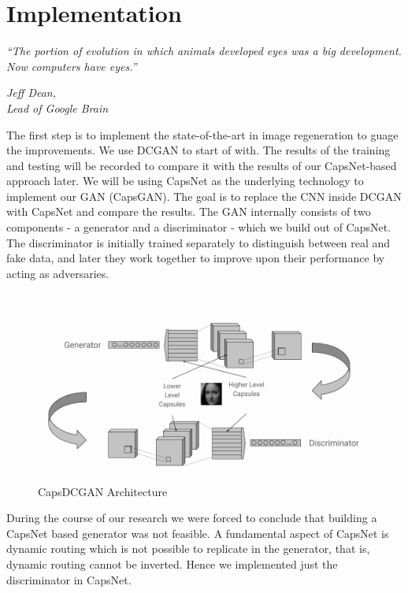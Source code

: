 \chapter{Implementation}\label{ch:implementation}
\epigraph{\textit{ \normalsize“The portion of evolution in which animals developed eyes was a big development. Now computers have eyes.”}}{\normalsize\textit{Jeff Dean,\\ Lead of Google Brain}}


The first step is to implement the state-of-the-art in image regeneration to guage the improvements. We use DCGAN to start of with. The results of the training and testing will be recorded to compare it with the results of our CapsNet-based approach later. We will be using CapsNet as the underlying technology to implement our GAN (CapsGAN). The goal is to replace the CNN inside DCGAN with CapsNet and compare the results. The GAN internally consists of two components - a generator and a discriminator - which we build out of CapsNet. The discriminator is initially trained separately to distinguish between real and fake data, and later they work together to improve upon their performance by acting as adversaries.
\par\bigskip

\begin{figure}[H]
\centering\includegraphics[width=1\textwidth]{images/methodology.png}
\caption{CapsDCGAN Architecture}
\label{fig:capsgan}
\end{figure}

During the course of our research we were forced to conclude that building a CapsNet based generator was not feasible. A fundamental aspect of CapsNet is dynamic routing which is not possible to replicate in the generator, that is, dynamic routing cannot be inverted. Hence we implemented just the discriminator in CapsNet. 
\par\bigskip


